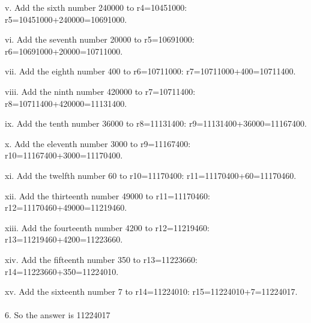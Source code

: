 \documentclass{article} %
\begin{document}
\begin{tcolorbox}[title = {Multiplication}, colback = Apricot!25!white, colframe = BrickRed!75!black,]
    \qquad v. Add the sixth number 240000 to r4=10451000: r5=10451000+240000=10691000. 
    
    \qquad vi. Add the seventh number 20000 to r5=10691000: r6=10691000+20000=10711000. 
    
    \qquad vii. Add the eighth number 400 to r6=10711000: r7=10711000+400=10711400. 
    
    \qquad viii. Add the ninth number 420000 to r7=10711400: r8=10711400+420000=11131400. 
    
    \qquad ix. Add the tenth number 36000 to r8=11131400: r9=11131400+36000=11167400. 
    
    \qquad x. Add the eleventh number 3000 to r9=11167400: r10=11167400+3000=11170400. 
    
    \qquad xi. Add the twelfth number 60 to r10=11170400: r11=11170400+60=11170460. 
    
    \qquad xii. Add the thirteenth number 49000 to r11=11170460: r12=11170460+49000=11219460. 
    
    \qquad xiii. Add the fourteenth number 4200 to r12=11219460: r13=11219460+4200=11223660. 
    
    \qquad xiv. Add the fifteenth number 350 to r13=11223660: r14=11223660+350=11224010.
    
    \qquad xv. Add the sixteenth number 7 to r14=11224010: r15=11224010+7=11224017. \\ \\
6. So the answer is 11224017 
\end{tcolorbox}
\noindent\begin{minipage}{\textwidth}
 \label{Tab:example_simple_mul_skill}
\end{minipage}

\newpage
\end{document}
